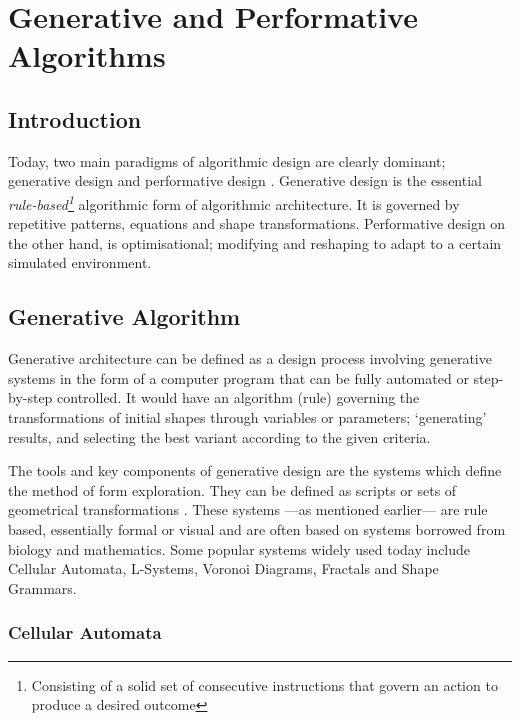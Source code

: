 \chapter{Generative and Performative Algorithms}

\section{Introduction}

Today, two main paradigms of algorithmic design are clearly dominant; generative design and performative design \cite{fasoulaki08}. Generative design is the essential \emph{rule-based\footnote{Consisting of a solid set of consecutive instructions that govern an action to produce a desired outcome}} algorithmic form of algorithmic architecture. It is governed by repetitive patterns, equations and shape transformations.  Performative design on the other hand, is optimisational; modifying and reshaping to adapt to a certain simulated environment.

\section{Generative Algorithm}

Generative architecture can be defined as a design process involving generative systems in the form of a computer program that can be fully automated or step-by-step controlled. It would have an algorithm (rule) governing the transformations of initial shapes through variables or parameters; `generating' results, and selecting the best variant according to the given criteria. \cite{arida04}

The tools and key components of generative design are the systems which define the method of form exploration. They can be defined as scripts or sets of geometrical transformations \cite{arida04}. These systems ---as mentioned earlier--- are rule based, essentially formal or visual and are often based on systems borrowed from biology and mathematics. Some popular systems widely used today include Cellular Automata, L-Systems, Voronoi Diagrams, Fractals and Shape Grammars.

\subsection{Cellular Automata}

